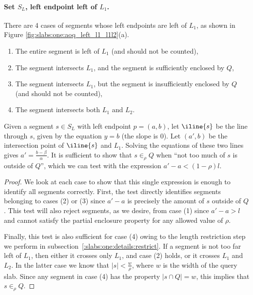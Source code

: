 \paragraph{Set $S_L$, left endpoint left of $L_1$.} There are 4 cases of segments whose left endpoints are left of $L_1$, as shown in Figure \ref{fig:slabs:one:aoq_left_l1_l1l2}(a).

\begin{enumerate}
 \item The entire segment is left of $L_1$ (and should not be counted),

 \item The segment intersects $L_1$, and the segment is sufficiently enclosed by $Q$,

 \item The segment intersects $L_1$, but the segment is insufficiently enclosed by $Q$ (and should not be counted),

 \item The segment intersects both $L_1$ and $L_2$. 

\end{enumerate}

Given a segment $s \in S_L$ with left endpoint $p = (a,b)$, let $\iline{s}$ be the line through $s$, given by the equation $y = b$ (the slope is 0). 
Let $(a', b)$ be the intersection point of $\iline{s}$ and $L_1$. 
Solving the equations of these two lines gives $a' = \frac{b - \beta}{\alpha}$. 
It is sufficient to show that $s \in_\rho Q$ when ``not too much of $s$ is outside of $Q$'', which we can test with the expression $a' - a < (1 - \rho)l$.

\begin{proof}
We look at each case to show that this single expression is enough to identify all segments correctly. 
First, the test directly identifies segments belonging to cases (2) or (3) since $a' - a$ is precisely the amount of $s$ outside of $Q$. 
This test will also reject segments, as we desire, from case (1) since $a' - a > l$ and cannot satisfy the partial enclosure property for any allowed value of $\rho$. 

Finally, this test is also sufficient for case (4) owing to the length restriction step we perform in subsection~\ref{:slabs:one:details:restrict}. 
If a segment is not too far left of $L_1$, then either it crosses only $L_1$, and case (2) holds, or it crosses $L_1$ and $L_2$. 
In the latter case we know that $|s| < \frac{w}{\rho}$, where $w$ is the width of the query slab. 
Since any segment in case (4) has the property $|s \cap Q| = w$, this implies that $s \in_\rho Q$.
\end{proof}

